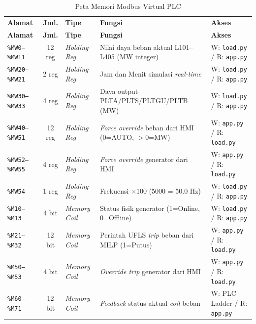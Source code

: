 \begin{enumerate}
\begin{longtable}{|p{2.6cm}|c|p{2.0cm}|p{5.2cm}|p{2.8cm}|}
    \caption{Peta Memori Modbus Virtual PLC}
    \label{tab:peta_memori}
    \vspace{-0.75em}\\
    \hline
    \textbf{Alamat} & \textbf{Jml.} & \textbf{Tipe} & \textbf{Fungsi} & \textbf{Akses} \\ \hline
    \endfirsthead
    \hline
    \textbf{Alamat} & \textbf{Jml.} & \textbf{Tipe} & \textbf{Fungsi} & \textbf{Akses} \\ \hline
    \endhead
    \texttt{\%MW0--\%MW11}  & 12 reg & \textit{Holding Reg} & Nilai daya beban aktual L101--L405 (MW integer) & W: \texttt{load.py} / R: \texttt{app.py} \\ \hline
    \texttt{\%MW20--\%MW21} & 2 reg  & \textit{Holding Reg} & Jam dan Menit simulasi \textit{real-time} & W: \texttt{load.py} / R: \texttt{app.py} \\ \hline
    \texttt{\%MW30--\%MW33} & 4 reg  & \textit{Holding Reg} & Daya output PLTA/PLTS/PLTGU/PLTB (MW) & W: \texttt{load.py} / R: \texttt{app.py} \\ \hline
    \texttt{\%MW40--\%MW51} & 12 reg & \textit{Holding Reg} & \textit{Force override} beban dari HMI (0=AUTO, $>$0=MW) & W: \texttt{app.py} / R: \texttt{load.py} \\ \hline
    \texttt{\%MW52--\%MW55} & 4 reg  & \textit{Holding Reg} & \textit{Force override} generator dari HMI & W: \texttt{app.py} / R: \texttt{load.py} \\ \hline
    \texttt{\%MW54}         & 1 reg  & \textit{Holding Reg} & Frekuensi $\times 100$ (5000 = 50.0 Hz) & W: \texttt{load.py} / R: \texttt{app.py} \\ \hline
    \texttt{\%M10--\%M13}   & 4 bit  & \textit{Memory Coil} & Status fisik generator (1=Online, 0=Offline) & W: \texttt{load.py} / R: \texttt{app.py} \\ \hline
    \texttt{\%M21--\%M32}   & 12 bit & \textit{Memory Coil} & Perintah UFLS \textit{trip} beban dari MILP (1=Putus) & W: \texttt{app.py} / R: \texttt{load.py} \\ \hline
    \texttt{\%M50--\%M53}   & 4 bit  & \textit{Memory Coil} & \textit{Override trip} generator dari HMI & W: \texttt{app.py} / R: \texttt{load.py} \\ \hline
    \texttt{\%M60--\%M71}   & 12 bit & \textit{Memory Coil} & \textit{Feedback} status aktual \textit{coil} beban & W: PLC Ladder / R: \texttt{app.py} \\ \hline
\end{longtable}


\end{enumerate}
